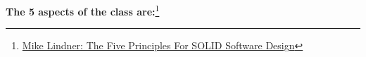 \documentclass[calcdimensions,landscape,letterpaper]{powersem}
\newcommand{\thecurrentheading}{}
\newcommand{\heading}[1]{\renewcommand{\thecurrentheading}{#1}}
\begin{document}
\begin{slide}
  \heading{Aspects of a Class}
  \begin{center}
    \textbf{The 5 aspects of the class are:}\footnote{\href{https://swarch.blog/the-five-principles-for-solid-software-design/}{Mike Lindner: The Five Principles For SOLID Software Design}}\\
  \end{center}
\end{slide}
\end{document}
